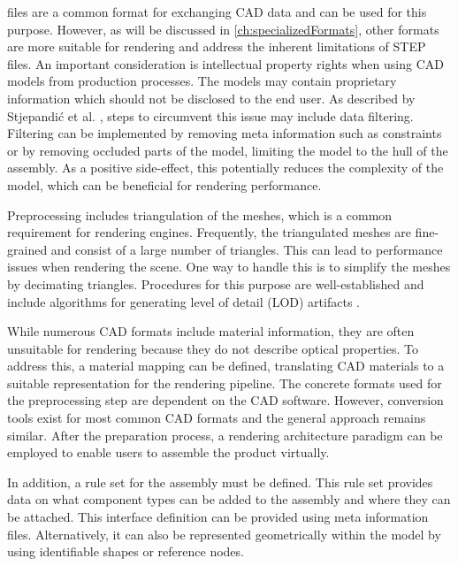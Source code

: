  files are a common format for exchanging \gls{CAD} data and can be used for this purpose. However, as will be discussed in \autoref{ch:specializedFormats}, other formats are more suitable for rendering and address the inherent limitations of \gls{STEP} files. An important consideration is intellectual property rights when using \gls{CAD} models from production processes. The models may contain proprietary information which should not be disclosed to the end user. As described by Stjepandić et al. \cite{ipr}, steps to circumvent this issue may include data filtering. Filtering can be implemented by removing meta information such as constraints or by removing occluded parts of the model, limiting the model to the hull of the assembly. As a positive side-effect, this potentially reduces the complexity of the model, which can be beneficial for rendering performance.

Preprocessing includes triangulation of the meshes, which is a common requirement for rendering engines. Frequently, the triangulated meshes are fine-grained and consist of a large number of triangles. This can lead to performance issues when rendering the scene. One way to handle this is to simplify the meshes by decimating triangles. Procedures for this purpose are well-established and include algorithms for generating level of detail (\gls{LOD}) artifacts \cite{luebke2003level}.

While numerous \gls{CAD} formats include material information, they are often unsuitable for rendering because they do not describe optical properties. To address this, a material mapping can be defined, translating \gls{CAD} materials to a suitable representation for the rendering pipeline. The concrete formats used for the preprocessing step are dependent on the \gls{CAD} software. However, conversion tools exist for most common \gls{CAD} formats and the general approach remains similar. After the preparation process, a rendering architecture paradigm can be employed to enable users to assemble the product virtually.

In addition, a rule set for the assembly must be defined. This rule set provides data on what component types can be added to the assembly and where they can be attached. This interface definition can be provided using meta information files. Alternatively, it can also be represented geometrically within the model by using identifiable shapes or reference nodes.

